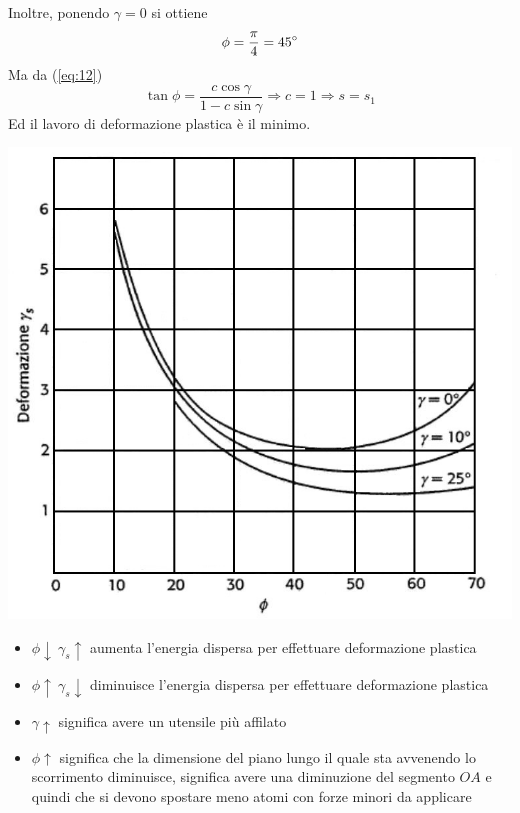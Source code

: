 \documentclass[a4paper, 15pt]{article}
\newcommand{\compresslist}{ %
			\setlength{\itemsep}{1pt}
			\setlength{\parskip}{0pt}
			\setlength{\parsep}{0pt}
		}
\begin{document}
	Inoltre, ponendo $\gamma=0$ si ottiene 
	\[\phi= {\pi\over4}=45\degree\]
	Ma da (\ref{eq:12})
	\[\tan\phi = \dfrac{c\cos\gamma}{1-c\sin\gamma} \Rightarrow c=1 \Rightarrow s=s_1\]
	Ed il lavoro di deformazione plastica è il minimo. 
	\newpage
\begin{center}
	\includegraphics[width=0.5\linewidth]{figures/asp7}
\end{center}
	\begin{itemize}\compresslist
		\item \(\phi\downarrow ~ \gamma_s\uparrow\) aumenta l'energia dispersa per effettuare deformazione plastica
		\item \(\phi\uparrow ~ \gamma_s\downarrow\) diminuisce l'energia dispersa per effettuare deformazione plastica
	\end{itemize}
	\begin{itemize}\compresslist
		\item $\gamma \uparrow$ significa avere un utensile più affilato
		\item $\phi\uparrow$ significa che la dimensione del piano lungo il quale sta avvenendo lo scorrimento diminuisce, significa avere una diminuzione del segmento $OA$ e quindi che si devono spostare meno atomi con forze minori da applicare
	\end{itemize}
	\newpage
\end{document}
